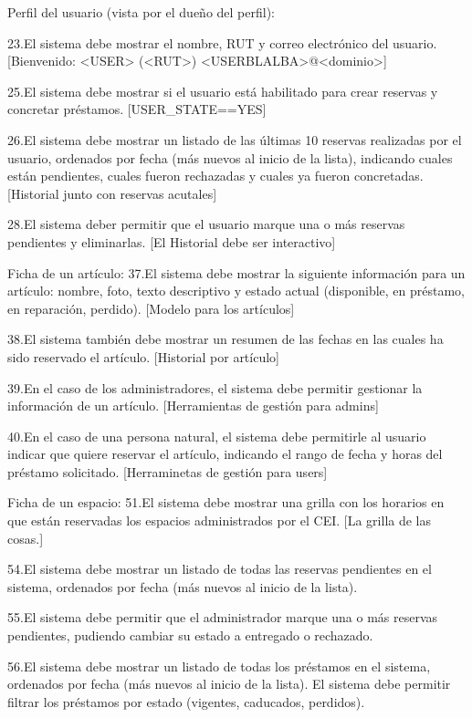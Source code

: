 {Perfil del usuario (vista por el dueño del perfil):

	23.El sistema debe mostrar el nombre, RUT y correo electrónico del usuario.
		[Bienvenido: <USER> (<RUT>) <USERBLALBA>@<dominio>]
	
	25.El sistema debe mostrar si el usuario está habilitado para crear reservas y concretar préstamos.
		[USER_STATE==YES]
	
	26.El sistema debe mostrar un listado de las últimas 10 reservas realizadas por el usuario, ordenados por fecha (más nuevos al inicio de la lista), indicando cuales están pendientes, cuales fueron rechazadas y cuales ya fueron concretadas.
		[Historial junto con reservas acutales]

	28.El sistema deber permitir que el usuario marque una o más reservas pendientes y eliminarlas.
		[El Historial debe ser interactivo]

Ficha de un artículo:
	37.El sistema debe mostrar la siguiente información para un artículo: nombre, foto, texto descriptivo y estado actual (disponible, en préstamo, en reparación, perdido).
		[Modelo para los artículos]

	38.El sistema también debe mostrar un resumen de las fechas en las cuales ha sido reservado el artículo.
		[Historial por artículo]
	
	39.En el caso de los administradores, el sistema debe permitir gestionar la información de un artículo.
		[Herramientas de gestión para admins]

	40.En el caso de una persona natural, el sistema debe permitirle al usuario indicar que quiere reservar el artículo, indicando el rango de fecha y horas del préstamo solicitado.
		[Herraminetas de gestión para users]

Ficha de un espacio:
	51.El sistema debe mostrar una grilla con los horarios en que están reservadas los espacios administrados por el CEI.
		[La grilla de las cosas.]

	54.El sistema debe mostrar un listado de todas las reservas pendientes en el sistema, ordenados por fecha (más nuevos al inicio de la lista).
			

	55.El sistema debe permitir que el administrador marque una o más reservas pendientes, pudiendo cambiar su estado a entregado o rechazado.
		

	56.El sistema debe mostrar un listado de todas los préstamos en el sistema, ordenados por fecha (más nuevos al inicio de la lista). El sistema debe permitir filtrar los préstamos por estado (vigentes, caducados, perdidos).}